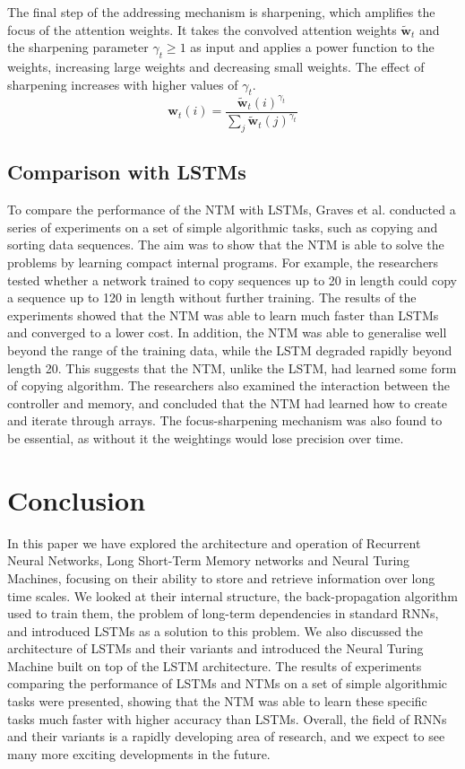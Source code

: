 \documentclass{article}
\begin{document}
The final step of the addressing mechanism is sharpening, which amplifies the focus of the
attention weights. It takes the convolved attention weights $\tilde{\textbf{w}}_t$ and the
sharpening parameter $\gamma_t \geq 1$ as input and applies a power function to the
weights, increasing large weights and decreasing small weights. The effect of sharpening
increases with higher values of $\gamma_t$.
\begin{equation}
  \textbf{w}_t(i) = \frac{\tilde{\textbf{w}}_t(i)^{\gamma_t}}{\sum_{j} \tilde{\textbf{w}}_t(j)^{\gamma_t}}
\end{equation}


\subsection{Comparison with LSTMs}
\label{sec:4.2}

To compare the performance of the NTM with LSTMs, Graves et al. conducted a series of
experiments on a set of simple algorithmic tasks, such as copying and sorting data
sequences. The aim was to show that the NTM is able to solve the problems by learning
compact internal programs. For example, the researchers tested whether a network trained
to copy sequences up to 20 in length could copy a sequence up to 120 in length without
further training. The results of the experiments showed that the NTM was able to learn
much faster than LSTMs and converged to a lower cost. In addition, the NTM was able to
generalise well beyond the range of the training data, while the LSTM degraded rapidly
beyond length 20. This suggests that the NTM, unlike the LSTM, had learned some form of
copying algorithm. The researchers also examined the interaction between the controller
and memory, and concluded that the NTM had learned how to create and iterate through
arrays. The focus-sharpening mechanism was also found to be essential, as without it the
weightings would lose precision over time.


\section{Conclusion}
\label{ch:5}

In this paper we have explored the architecture and operation of Recurrent Neural
Networks, Long Short-Term Memory networks and Neural Turing Machines, focusing on their
ability to store and retrieve information over long time scales. We looked at their
internal structure, the back-propagation algorithm used to train them, the problem of
long-term dependencies in standard RNNs, and introduced LSTMs as a solution to this
problem. We also discussed the architecture of LSTMs and their variants and introduced the
Neural Turing Machine built on top of the LSTM architecture. The results of experiments
comparing the performance of LSTMs and NTMs on a set of simple algorithmic tasks were
presented, showing that the NTM was able to learn these specific tasks much faster with
higher accuracy than LSTMs. Overall, the field of RNNs and their variants is a rapidly
developing area of research, and we expect to see many more exciting developments in the
future.



\newpage
\nocite{}


\end{document}
